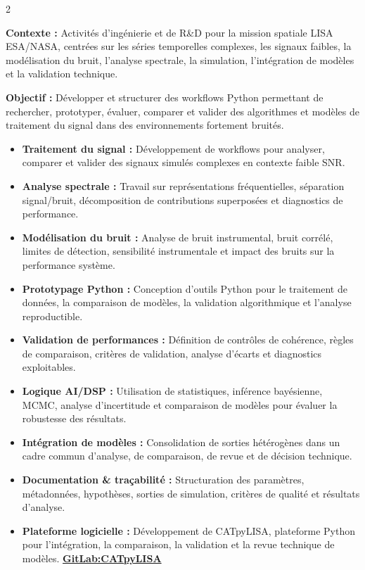 \documentclass[8pt,a4paper,ragged2e,withhyper]{altacv}
\begin{document}
\begin{paracol}{2}
\divider


\textbf{Contexte :} Activités d’ingénierie et de R\&D pour la mission spatiale LISA ESA/NASA, centrées sur les séries temporelles complexes, les signaux faibles, la modélisation du bruit, l’analyse spectrale, la simulation, l’intégration de modèles et la validation technique.

\textbf{Objectif :} Développer et structurer des workflows Python permettant de rechercher, prototyper, évaluer, comparer et valider des algorithmes et modèles de traitement du signal dans des environnements fortement bruités.

\begin{itemize}
  \item \textbf{Traitement du signal :} Développement de workflows pour analyser, comparer et valider des signaux simulés complexes en contexte faible SNR.
  \item \textbf{Analyse spectrale :} Travail sur représentations fréquentielles, séparation signal/bruit, décomposition de contributions superposées et diagnostics de performance.
  \item \textbf{Modélisation du bruit :} Analyse de bruit instrumental, bruit corrélé, limites de détection, sensibilité instrumentale et impact des bruits sur la performance système.
  \item \textbf{Prototypage Python :} Conception d’outils Python pour le traitement de données, la comparaison de modèles, la validation algorithmique et l’analyse reproductible.
  \item \textbf{Validation de performances :} Définition de contrôles de cohérence, règles de comparaison, critères de validation, analyse d’écarts et diagnostics exploitables.
  \item \textbf{Logique AI/DSP :} Utilisation de statistiques, inférence bayésienne, MCMC, analyse d’incertitude et comparaison de modèles pour évaluer la robustesse des résultats.
  \item \textbf{Intégration de modèles :} Consolidation de sorties hétérogènes dans un cadre commun d’analyse, de comparaison, de revue et de décision technique.
  \item \textbf{Documentation \& traçabilité :} Structuration des paramètres, métadonnées, hypothèses, sorties de simulation, critères de qualité et résultats d’analyse.
  \item \textbf{Plateforme logicielle :} Développement de CATpyLISA, plateforme Python pour l’intégration, la comparaison, la validation et la revue technique de modèles.
  \textcolor{DarkPastelRed}{\href{https://gitlab.oca.eu/gboileau/lisa_l3_tools}{\bf GitLab:CATpyLISA}}
\end{itemize}


\end{paracol}
\end{document}

